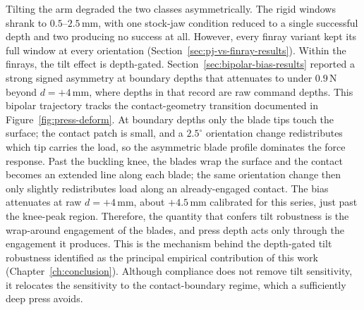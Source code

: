 Tilting the arm degraded the two classes asymmetrically. The rigid
windows shrank to $0.5$--$2.5$\,mm, with one stock-jaw condition
reduced to a single successful depth and two producing no success at
all. However, every finray variant kept its full window at every
orientation (Section~\ref{sec:pj-vs-finray-results}). Within the
finrays, the tilt effect is depth-gated. Section~\ref{sec:bipolar-bias-results}
reported a strong signed asymmetry at boundary depths that attenuates
to under $0.9$\,N beyond $d = +4$\,mm, where depths in that record are
raw command depths. This bipolar trajectory tracks the contact-geometry
transition documented in Figure~\ref{fig:press-deform}. At boundary depths only the blade tips
touch the surface; the contact patch is small, and a $2.5^{\circ}$
orientation change redistributes which tip carries the load, so the
asymmetric blade profile dominates the force response. Past the
buckling knee, the blades wrap the surface and the contact becomes an
extended line along each blade; the same orientation change then only
slightly redistributes load along an already-engaged contact. The
bias attenuates at raw $d = +4$\,mm, about $+4.5$\,mm calibrated for
this series, just past the knee-peak region. Therefore, the quantity
that confers tilt robustness is the wrap-around engagement of the
blades, and press depth acts only through the engagement it produces.
This is
the mechanism behind the depth-gated tilt robustness identified as the
principal empirical contribution of this work
(Chapter~\ref{ch:conclusion}). Although compliance does not remove tilt
sensitivity, it relocates the sensitivity to the contact-boundary
regime, which a sufficiently deep press avoids.

